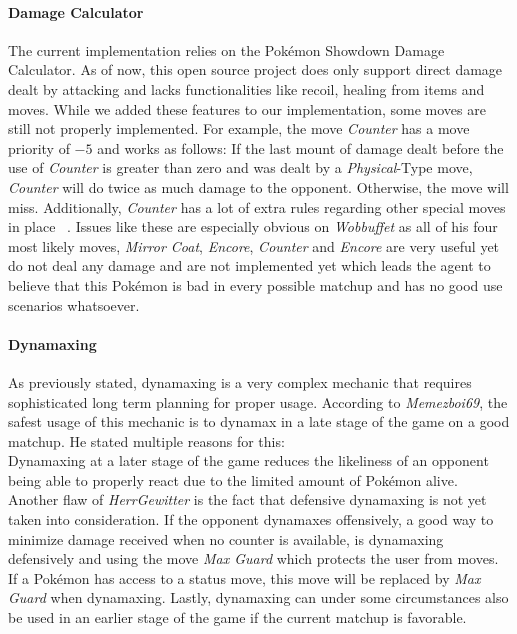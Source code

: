 \paragraph{Damage Calculator}
The current implementation relies on the Pokémon Showdown Damage Calculator. As of now, this open source project does 
only support direct damage dealt by attacking and lacks functionalities like recoil, healing from items and moves. While
we added these features to our implementation, some moves are still not properly implemented. For example, the move
\textit{Counter} has a move priority of $-5$ and works as follows:
If the last mount of damage dealt before the use of \textit{Counter} is greater than zero and was dealt by a 
\textit{Physical}-Type move, \textit{Counter} will do twice as much damage to the opponent. Otherwise, the move
will miss. Additionally, \textit{Counter} has a lot of extra rules regarding other special moves in place 
~\autocite{Bulbapedia:Counter}. Issues like these are especially obvious on \textit{Wobbuffet} as all of his four
most likely moves, \textit{Mirror Coat}, \textit{Encore}, \textit{Counter} and \textit{Encore} are very useful
yet do not deal any damage and are not implemented yet which leads the agent to believe that this Pokémon is bad 
in every possible matchup and has no good use scenarios whatsoever.

\paragraph{Dynamaxing}
\label{par:eval-dynamx}
As previously stated, dynamaxing is a very complex mechanic that requires sophisticated long term planning for
proper usage. According to \textit{Memezboi69}, the safest usage of this mechanic is to dynamax in a late stage
of the game on a good matchup. He stated multiple reasons for this: \\
Dynamaxing at a later stage of the game reduces the likeliness of an opponent being able to properly react due to the 
limited amount of Pokémon alive. \\
Another flaw of \textit{HerrGewitter} is the fact that defensive dynamaxing is not yet taken into consideration. 
If the opponent dynamaxes offensively, a good way to minimize damage received when no counter is available, is dynamaxing
defensively and using the move \textit{Max Guard} which protects the user from moves. If a Pokémon has access to 
a status move, this move will be replaced by \textit{Max Guard} when dynamaxing. Lastly, dynamaxing can under 
some circumstances also be used in an earlier stage of the game if the current matchup is favorable. 

